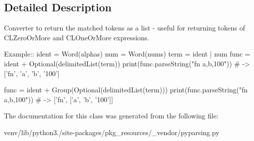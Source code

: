 \subsection{Detailed Description}
\begin{DoxyVerb}Converter to return the matched tokens as a list - useful for returning tokens of C{L{ZeroOrMore}} and C{L{OneOrMore}} expressions.

Example::
    ident = Word(alphas)
    num = Word(nums)
    term = ident | num
    func = ident + Optional(delimitedList(term))
    print(func.parseString("fn a,b,100"))  # -> ['fn', 'a', 'b', '100']

    func = ident + Group(Optional(delimitedList(term)))
    print(func.parseString("fn a,b,100"))  # -> ['fn', ['a', 'b', '100']]
\end{DoxyVerb}
 

The documentation for this class was generated from the following file\+:\begin{DoxyCompactItemize}
\item 
venv/lib/python3./site-\/packages/pkg\+\_\+resources/\+\_\+vendor/pyparsing.\+py\end{DoxyCompactItemize}
